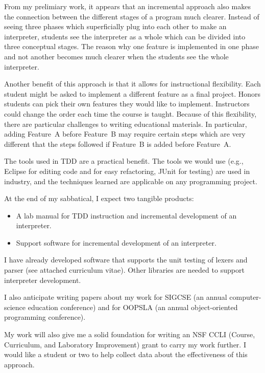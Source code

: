 \documentclass{article}
\begin{document}
From my prelimiary work, it appears that an incremental approach also makes the connection between the different stages of a program much clearer.  Instead of seeing three phases which superficially plug into each other to make an interpreter, students see the interpreter as a whole which can be divided into three conceptual stages.  The reason why one feature is implemented in one phase and not another becomes much clearer when the students see the whole interpreter.

Another benefit of this approach is that it allows for instructional flexibility.  Each student might be asked to implement a different feature as a final project.  Honors students can pick their own features they would like to implement.  Instructors could change the order each time the course is taught.  Because of this flexibility, there are particular challenges to writing educational materials.  In particular, adding Feature~A before Feature~B may require certain steps which are very different that the steps followed if Feature~B is added before Feature~A.

The tools used in TDD are a practical benefit.  The tools we would use (e.g., Eclipse for editing code and for easy refactoring, JUnit for testing) are used in industry, and the techniques learned are applicable on any programming project.

At the end of my sabbatical, I expect two tangible products:
\begin{itemize}
\item A lab manual for TDD instruction and incremental development of an interpreter.
\item Support software for incremental development of an interpreter.
\end{itemize}
I have already developed software that supports the unit testing of lexers and parser (see attached curriculum vitae).  Other libraries are needed to support interpreter development.

I also anticipate writing papers about my work for SIGCSE (an annual computer-science education conference) and for OOPSLA (an annual object-oriented programming conference).

My work will also give me a solid foundation for writing an NSF CCLI (Course, Curriculum, and Laboratory Improvement) grant to carry my work further.  I would like a student or two to help collect data about the effectiveness of this approach.

\end{document}

